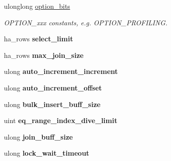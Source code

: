 \begin{DoxyCompactItemize}
\mbox{\label{structsystem__variables_a4eb214ff2c0b9d4cccf21394095d28dc}} 
ulonglong \mbox{\hyperlink{structsystem__variables_a4eb214ff2c0b9d4cccf21394095d28dc}{option\+\_\+bits}}
\begin{DoxyCompactList}\small\item\em O\+P\+T\+I\+O\+N\+\_\+xxx constants, e.\+g. O\+P\+T\+I\+O\+N\+\_\+\+P\+R\+O\+F\+I\+L\+I\+NG. \end{DoxyCompactList}\item 
\mbox{\label{structsystem__variables_a0cc4eed95cadca813d133310ab5d75b3}} 
ha\+\_\+rows {\bfseries select\+\_\+limit}
\item 
\mbox{\label{structsystem__variables_ae71e057a96303baed190153a4af991cf}} 
ha\+\_\+rows {\bfseries max\+\_\+join\+\_\+size}
\item 
\mbox{\label{structsystem__variables_aa8cf6a88e370a92e28735c7a7ff3f7bd}} 
ulong {\bfseries auto\+\_\+increment\+\_\+increment}
\item 
\mbox{\label{structsystem__variables_a4af4629c23afae5b820034f5b1051175}} 
ulong {\bfseries auto\+\_\+increment\+\_\+offset}
\item 
\mbox{\label{structsystem__variables_a1183d148f948f07ca0c3e28b215a66b4}} 
ulong {\bfseries bulk\+\_\+insert\+\_\+buff\+\_\+size}
\item 
\mbox{\label{structsystem__variables_a26f04ddabf1681e5e2201d63c234ebf0}} 
uint {\bfseries eq\+\_\+range\+\_\+index\+\_\+dive\+\_\+limit}
\item 
\mbox{\label{structsystem__variables_af56323eaa3f8eddcaa5449acd4ebe7a7}} 
ulong {\bfseries join\+\_\+buff\+\_\+size}
\item 
\mbox{\label{structsystem__variables_ae1c8618366bc6d1bd7e8399aa7c761e6}} 
ulong {\bfseries lock\+\_\+wait\+\_\+timeout}
\item 
\mbox{\label{structsystem__variables_a53a18b911f960af4017fffbe7b2536c7}} 

\end{DoxyCompactItemize}
